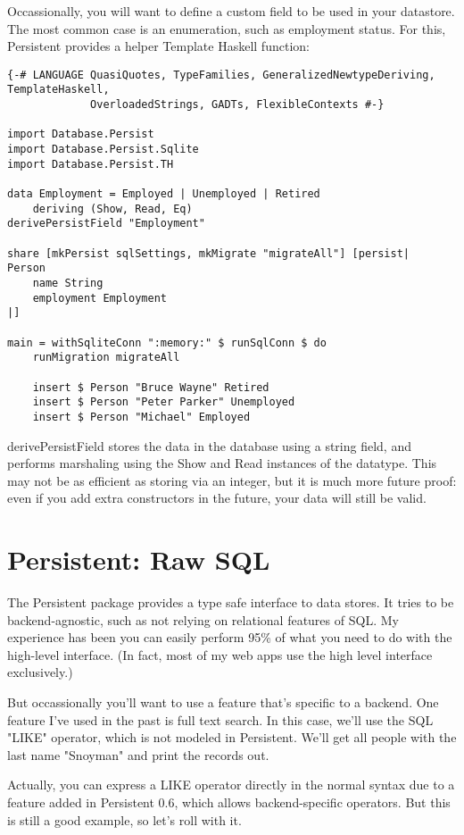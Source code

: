Occassionally, you will want to define a custom field to be used in your datastore. The most common case is an enumeration, such as employment status. For this, Persistent provides a helper Template Haskell function:

\begin{lstlisting}
{-# LANGUAGE QuasiQuotes, TypeFamilies, GeneralizedNewtypeDeriving, TemplateHaskell,
             OverloadedStrings, GADTs, FlexibleContexts #-}

import Database.Persist
import Database.Persist.Sqlite
import Database.Persist.TH

data Employment = Employed | Unemployed | Retired
    deriving (Show, Read, Eq)
derivePersistField "Employment"

share [mkPersist sqlSettings, mkMigrate "migrateAll"] [persist|
Person
    name String
    employment Employment
|]

main = withSqliteConn ":memory:" $ runSqlConn $ do
    runMigration migrateAll

    insert $ Person "Bruce Wayne" Retired
    insert $ Person "Peter Parker" Unemployed
    insert $ Person "Michael" Employed
\end{lstlisting}%

derivePersistField stores the data in the database using a string field, and performs marshaling using the Show and Read instances of the datatype. This may not be as efficient as storing via an integer, but it is much more future proof: even if you add extra constructors in the future, your data will still be valid.

\section{Persistent: Raw SQL}

The Persistent package provides a type safe interface to data stores. It tries to be backend-agnostic, such as not relying on relational features of SQL. My experience has been you can easily perform 95\% of what you need to do with the high-level interface. (In fact, most of my web apps use the high level interface exclusively.)

But occassionally you'll want to use a feature that's specific to a backend. One feature I've used in the past is full text search. In this case, we'll use the SQL "LIKE" operator, which is not modeled in Persistent. We'll get all people with the last name "Snoyman" and print the records out.

Actually, you can express a LIKE operator directly in the normal syntax due to a feature added in Persistent 0.6, which allows backend-specific operators. But this is still a good example, so let's roll with it.

